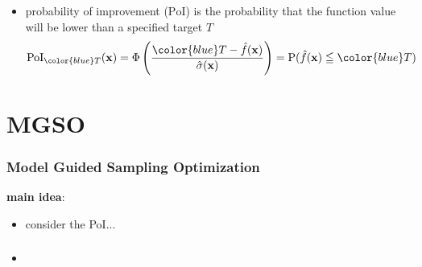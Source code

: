 \documentclass[sans,mathserif]{beamer}
\newcommand{\xx}{\mathrm{\mathbf{x}}}
\newcommand{\blue}[1]{{\color{blue} #1}}
\begin{document}
\begin{frame}
\begin{columns}[T]
{\begin{figure}
      \end{figure}
    }
  \end{columns}
  \begin{itemize}
    \item<2-> \alert{probability of improvement} ($\mathrm{PoI}$) is the probability that the function value will be lower than a specified \blue{target $T$}
      \begin{displaymath}
        \mathrm{PoI}_\blue{T}(\xx) = \Phi \left( \frac{\blue{T} - \hat{f}(\xx)}{\hat{\sigma}(\xx)} \right) = \mathrm{P}(\hat{f}(\xx) \leqq \blue{T})
      \end{displaymath}
  \end{itemize}
\end{frame}


\section{MGSO}

\begin{frame}
  \frametitle{Model Guided Sampling Optimization}
  \textbf{main idea}:
  \begin{itemize}
    \item consider the PoI...
  \end{itemize}
\end{frame}

\begin{frame}
  \frametitle{}
  \begin{itemize}
    \item
  \end{itemize}
\end{frame}
\end{document}

